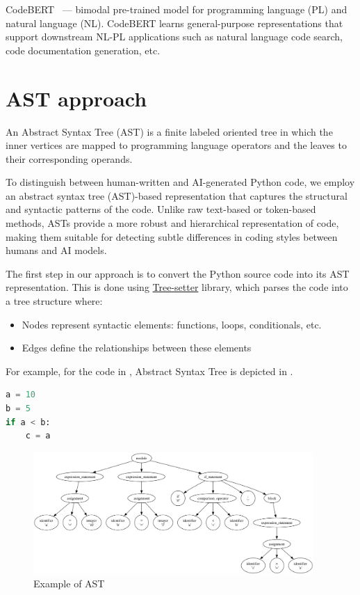 \documentclass{article}
\begin{document}
CodeBERT~\cite{Feng2020} --- bimodal pre-trained model for programming language (PL) and natural language (NL). CodeBERT learns general-purpose representations that support downstream NL-PL applications such as natural language code search, code documentation generation, etc.

\section{AST approach}
An Abstract Syntax Tree (AST) is a finite labeled oriented tree in which the inner vertices are mapped to programming language operators and the leaves to their corresponding operands.

To distinguish between human-written and AI-generated Python code, we employ an abstract syntax tree (AST)-based representation that captures the structural and syntactic patterns of the code. Unlike raw text-based or token-based methods, ASTs provide a more robust and hierarchical representation of code, making them suitable for detecting subtle differences in coding styles between humans and AI models.

The first step in our approach is to convert the Python source code into its AST representation. This is done using \href{https://tree-sitter.github.io/tree-sitter/}{Tree-setter} library, which parses the code into a tree structure where:

\begin{itemize}
  \item Nodes represent syntactic elements: functions, loops, conditionals, etc.
  \item Edges define the relationships between these elements
\end{itemize}

For example, for the code in , Abstract Syntax Tree is depicted in .

\begin{lstlisting}[language=Python,frame=single,caption=Python code snippet,label=lst:code_ast]
a = 10
b = 5
if a < b:
    c = a
\end{lstlisting}

\begin{figure}[H]
  \centering
  \includegraphics[width=0.95\textwidth]{./pictures/ast_output.png}
  \caption{Example of AST}\label{fig:ex_ast}
\end{figure}
\end{document}
